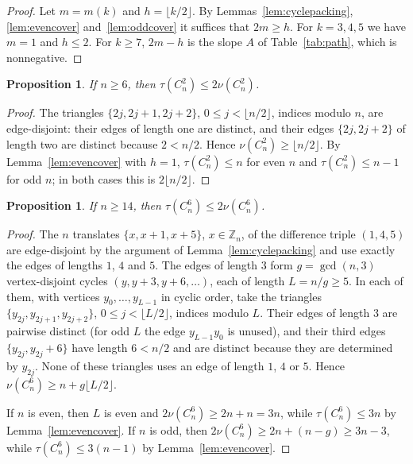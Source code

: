 \documentclass{amsart}
\newtheorem{proposition}[theorem]{Proposition}
\theoremstyle{definition}
\theoremstyle{remark}
\numberwithin{equation}{section}
\numberwithin{table}{section}
\newcommand{\Z}{\mathbb{Z}}
\begin{document}
\begin{proof}
Let $m=m(k)$ and $h=\lfloor k/2\rfloor$. By Lemmas~\ref{lem:cyclepacking}, \ref{lem:evencover} and~\ref{lem:oddcover} it suffices that $2m\ge h$. For $k=3,4,5$ we have $m=1$ and $h\le2$. For $k\ge7$, $2m-h$ is the slope $A$ of Table~\ref{tab:path}, which is nonnegative.
\end{proof}

\begin{proposition}\label{prop:cycle2}
If $n\ge6$, then $\tau(C_n^2)\le2\nu(C_n^2)$.
\end{proposition}

\begin{proof}
The triangles $\{2j,2j+1,2j+2\}$, $0\le j<\lfloor n/2\rfloor$, indices modulo $n$, are edge-disjoint: their edges of length one are distinct, and their edges $\{2j,2j+2\}$ of length two are distinct because $2<n/2$. Hence $\nu(C_n^2)\ge\lfloor n/2\rfloor$. By Lemma~\ref{lem:evencover} with $h=1$, $\tau(C_n^2)\le n$ for even $n$ and $\tau(C_n^2)\le n-1$ for odd $n$; in both cases this is $2\lfloor n/2\rfloor$.
\end{proof}

\begin{proposition}\label{prop:cycle6}
If $n\ge14$, then $\tau(C_n^6)\le2\nu(C_n^6)$.
\end{proposition}

\begin{proof}
The $n$ translates $\{x,x+1,x+5\}$, $x\in\Z_n$, of the difference triple $(1,4,5)$ are edge-disjoint by the argument of Lemma~\ref{lem:cyclepacking} and use exactly the edges of lengths $1$, $4$ and $5$. The edges of length $3$ form $g=\gcd(n,3)$ vertex-disjoint cycles $(y,y+3,y+6,\dots)$, each of length $L=n/g\ge5$. In each of them, with vertices $y_0,\dots,y_{L-1}$ in cyclic order, take the triangles $\{y_{2j},y_{2j+1},y_{2j+2}\}$, $0\le j<\lfloor L/2\rfloor$, indices modulo $L$. Their edges of length $3$ are pairwise distinct (for odd $L$ the edge $y_{L-1}y_0$ is unused), and their third edges $\{y_{2j},y_{2j}+6\}$ have length $6<n/2$ and are distinct because they are determined by $y_{2j}$. None of these triangles uses an edge of length $1$, $4$ or $5$. Hence $\nu(C_n^6)\ge n+g\lfloor L/2\rfloor$.

If $n$ is even, then $L$ is even and $2\nu(C_n^6)\ge2n+n=3n$, while $\tau(C_n^6)\le3n$ by Lemma~\ref{lem:evencover}. If $n$ is odd, then $2\nu(C_n^6)\ge2n+(n-g)\ge3n-3$, while $\tau(C_n^6)\le3(n-1)$ by Lemma~\ref{lem:evencover}.
\end{proof}
\end{document}
